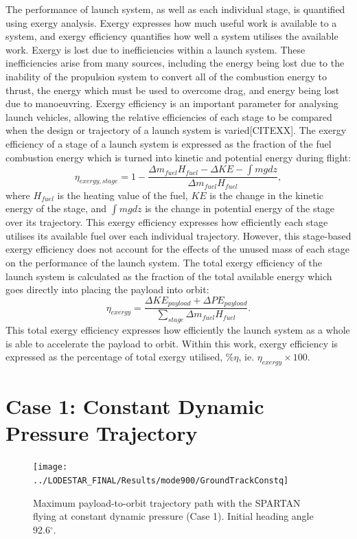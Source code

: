 The performance of launch system, as well as each individual stage, is quantified using exergy analysis. Exergy expresses how much useful work is available to a system, and exergy efficiency quantifies how well a system utilises the available work. Exergy is lost due to inefficiencies within a launch system. These inefficiencies arise from many sources, including the energy being lost due to the inability of the propulsion system to convert all of the combustion energy to thrust, the energy which must be used to overcome drag, and energy being lost due to manoeuvring. Exergy efficiency is an important parameter for analysing launch vehicles, allowing the relative efficiencies of each stage to be compared when the design or trajectory of a launch system is varied[CITEXX]. The exergy efficiency of a stage of a launch system is expressed as the fraction of the fuel combustion energy which is turned into kinetic and potential energy during flight:
\begin{equation}
\eta_{exergy,stage} = 1 - \frac{\Delta m_{fuel}H_{fuel} - \Delta KE - \int mg dz}{\Delta m_{fuel}H_{fuel}},
\end{equation}
where $H_{fuel}$ is the heating value of the fuel, $KE$ is the change in the kinetic energy of the stage, and $\int mg dz$ is the change in potential energy of the stage over its trajectory.
This exergy efficiency expresses how efficiently each stage utilises its available fuel over each individual trajectory. However, this stage-based exergy efficiency does not account for the effects of the unused mass of each stage on the performance of the launch system. The total exergy efficiency of the launch system is calculated as the fraction of the total available energy which goes directly into placing the payload into orbit:
\begin{equation}
\eta_{exergy} = \frac{\Delta KE_{payload} + \Delta PE_{payload}}{\sum_{stage} \Delta m_{fuel}H_{fuel}}.
\end{equation}
This total exergy efficiency expresses how efficiently the launch system as a whole is able to accelerate the payload to orbit. 
Within this work, exergy efficiency is expressed as the percentage of total exergy utilised, \%$\eta$, ie. $\eta_{exergy} \times 100$. 

\section{Case 1: Constant Dynamic Pressure Trajectory}
\begin{figure}[ht]
	\centering
	\texttt{[image: ../LODESTAR\_FINAL/Results/mode900/GroundTrackConstq]}
	\caption{Maximum payload-to-orbit trajectory path with the SPARTAN flying at constant dynamic pressure (Case 1). Initial heading angle 92.6$^\circ$.}
	\label{fig:GroundTrackConstq}
\end{figure}

